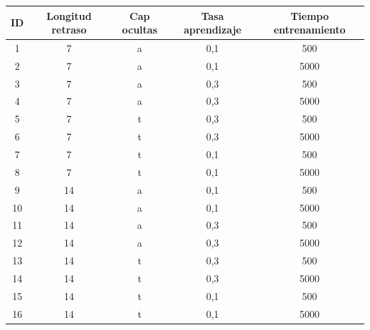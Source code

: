 \documentclass[12pt,a4paper, xcolor=table]{article}
\begin{document}
        \begin{table}[h]
        \begin{tabular}{|c|c|c|c|c|}
        \hline
        \rowcolor[HTML]{DAE8FC}
        \textbf{ID} & \textbf{Longitud retraso} & \textbf{Cap ocultas} & \textbf{Tasa aprendizaje} & \textbf{Tiempo entrenamiento} \\ \hline
        1                       & 7                   & a                      & 0,1                    & 500                    \\ \hline
        2                       & 7                   & a                      & 0,1                    & 5000                   \\ \hline
        3                       & 7                   & a                      & 0,3                    & 500                    \\ \hline
        4                       & 7                   & a                      & 0,3                    & 5000                   \\ \hline
        5                       & 7                   & t                      & 0,3                    & 500                    \\ \hline
        6                       & 7                   & t                      & 0,3                    & 5000                   \\ \hline
        7                       & 7                   & t                      & 0,1                    & 500                    \\ \hline
        8                       & 7                   & t                      & 0,1                    & 5000                   \\ \hline
        9                       & 14                  & a                      & 0,1                    & 500                    \\ \hline
        10                      & 14                  & a                      & 0,1                    & 5000                   \\ \hline
        11                      & 14                  & a                      & 0,3                    & 500                    \\ \hline
        12                      & 14                  & a                      & 0,3                    & 5000                   \\ \hline
        13                      & 14                  & t                      & 0,3                    & 500                    \\ \hline
        14                      & 14                  & t                      & 0,3                    & 5000                   \\ \hline
        15                      & 14                  & t                      & 0,1                    & 500                    \\ \hline
        16                      & 14                  & t                      & 0,1                    & 5000                   \\ \hline
        \end{tabular}
        \end{table}
\end{document}
